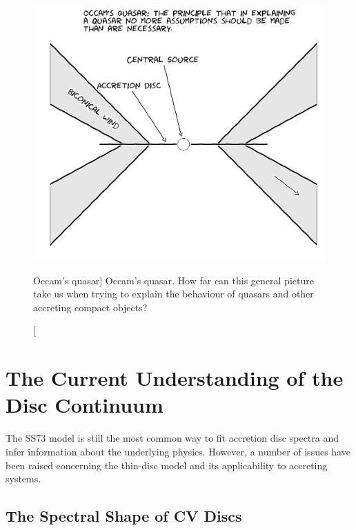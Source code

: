 \begin{figure}
\centering
\includegraphics[width=1.0\textwidth]{figures/01-intro/occam.jpg}
\caption
[Occam's quasar]
{
Occam's quasar. How far can this general picture take us when trying to explain
the behaviour of quasars and other accreting compact objects?
} 
\label{fig:occam}
\end{figure}


\section{The Current Understanding of the Disc Continuum}

\label{sec:disc_continuum}

The SS73 model is still the most common way to fit accretion disc spectra and infer
information about the underlying physics. However, 
a number of issues have been raised concerning the thin-disc model and
its applicability to accreting systems. 

\subsection{The Spectral Shape of CV Discs}


